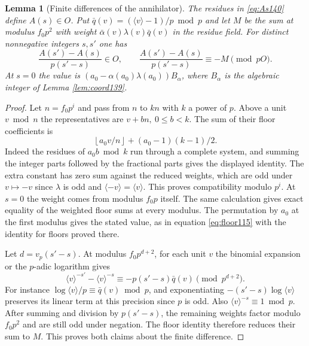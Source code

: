 \documentclass[a4paper,11pt]{article}
\newtheorem{lemma}[proposition]{Lemma}
\theoremstyle{definition}
\theoremstyle{remark}
\numberwithin{equation}{section}
\begin{document}
\begin{lemma}[Finite differences of the annihilator]
\label{lem:difference140}
The residues in \eqref{eq:As140} define \(A(s)\in O\).
Put \(\bar q(v)=(\langle v\rangle-1)/p\bmod p\) and let \(M\)
be the sum at modulus \(f_0p^2\) with weight
\(\bar\alpha(v)\lambda(v)\bar q(v)\) in the residue field.
For distinct nonnegative integers \(s,s'\) one has
\[
 \frac{A(s')-A(s)}{p(s'-s)}\in O,\qquad
 \frac{A(s')-A(s)}{p(s'-s)}\equiv-M\pmod{pO}.
\]
At \(s=0\) the value is
\((a_0-\alpha(a_0)\lambda(a_0))B_\alpha\), where \(B_\alpha\)
is the algebraic integer of Lemma \ref{lem:coord139}.
\end{lemma}
\begin{proof}
Let \(n=f_0p^i\) and pass from \(n\) to \(kn\) with \(k\) a
power of \(p\). Above a unit \(v\bmod n\) the representatives
are \(v+bn,\ 0\le b<k\). The sum of their floor coefficients is
\[
        \left\lfloor a_0v/n\right\rfloor
                       +(a_0-1)(k-1)/2 .
\]
Indeed the residues of \(a_0 b\bmod k\) run through a complete
system, and summing the integer parts followed by the fractional
parts gives the displayed identity. The extra constant has
zero sum against the reduced weights, which are odd under
\(v\mapsto-v\) since \(\lambda\) is odd and
\(\langle-v\rangle=\langle v\rangle\). This proves
compatibility modulo \(p^i\). At \(s=0\) the weight comes from
modulus \(f_0p\) itself. The same calculation gives exact
equality of the weighted floor sums at every modulus. The
permutation by \(a_0\) at the first modulus gives the stated
value, as in equation \ref{eq:floor115} with the identity for floors
proved there.

Let \(d=v_p(s'-s)\). At modulus \(f_0p^{d+2}\), for each
unit \(v\) the binomial expansion or the \(p\)-adic logarithm
gives
\[
 \langle v\rangle^{-s'}-\langle v\rangle^{-s}
       \equiv -p(s'-s)\bar q(v)\pmod{p^{d+2}} .
\]
For instance \(\log\langle v\rangle/p\equiv\bar q(v)\bmod p\),
and exponentiating \(-(s'-s)\log\langle v\rangle\) preserves
its linear term at this precision since \(p\) is odd.
Also \(\langle v\rangle^{-s}\equiv1\bmod p\). After summing
and division by \(p(s'-s)\), the remaining weights factor
modulo \(f_0p^2\) and are still odd under negation. The floor
identity therefore reduces their sum to \(M\). This proves both
claims about the finite difference.
\end{proof}
\end{document}
